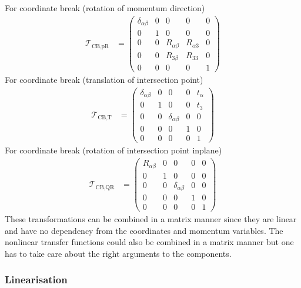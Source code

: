\documentclass[12pt,a4paper,twoside,openright,BCOR10mm,headsepline,titlepage,abstracton,chapterprefix,final]{scrreprt}
\begin{document}
For coordinate break (rotation of momentum direction)
\begin{align}
 \mathcal{T}_{\text{CB,pR}} &=
 \begin{pmatrix}
  \delta_{\alpha\beta} & 0 &  0 & 0 & 0\\
   0                   & 1 & 0 & 0 & 0\\
   0                   & 0 & R_{\alpha\beta} & R_{\alpha 3} & 0 \\
   0                   & 0 & R_{3\beta} & R_{33} & 0 \\
   0 & 0 & 0 & 0 & 1
 \end{pmatrix}
\end{align}
For coordinate break (translation of intersection point)
\begin{align}
 \mathcal{T}_{\text{CB,T}} &=
 \begin{pmatrix}
  \delta_{\alpha\beta} & 0 &  0 & 0 & t_\alpha\\
   0                   & 1 & 0 & 0 & t_3\\
   0                   & 0 & \delta_{\alpha\beta} & 0 & 0 \\
   0                   & 0 & 0 & 1 & 0 \\
   0 & 0 & 0 & 0 & 1
 \end{pmatrix}
\end{align}
For coordinate break (rotation of intersection point inplane)
\begin{align}
 \mathcal{T}_{\text{CB,QR}} &=
 \begin{pmatrix}
  R_{\alpha\beta} & 0 &  0 & 0 & 0\\
   0                   & 1 & 0 & 0 & 0\\
   0                   & 0 & \delta_{\alpha\beta} & 0 & 0 \\
   0                   & 0 & 0 & 1 & 0 \\
   0 & 0 & 0 & 0 & 1
 \end{pmatrix}
\end{align}
These transformations can be combined in a matrix manner since they
are linear and have no dependency from the coordinates and momentum variables.
The nonlinear transfer functions could also be combined in a matrix manner but
one has to take care about the right arguments to the components.


\subsubsection{Linearisation}
\end{document}

